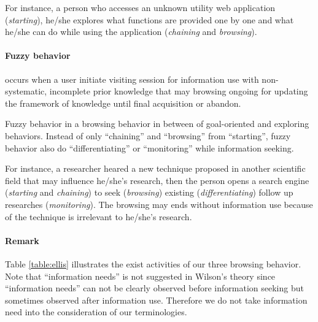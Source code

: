 For instance, a person who accesses an unknown utility web application (\emph{starting}), he/she explores
what functions are provided one by one and what he/she can do while using the application
(\emph{chaining} and \emph{browsing}).

\paragraph{Fuzzy behavior} occurs when a user initiate visiting session for information use
 with non-systematic, incomplete prior knowledge that may browsing ongoing for updating 
the framework of knowledge until final acquisition or abandon.

Fuzzy behavior in a browsing behavior in between of goal-oriented and exploring behaviors.
Instead of only ``chaining'' and ``browsing'' from ``starting'', fuzzy behavior also do
``differentiating'' or ``monitoring'' while information seeking.

For instance, a researcher heared a new technique proposed in another scientific field 
that may influence he/she's research, then the person 
opens a search engine (\emph{starting} and \emph{chaining}) to seek (\emph{browsing}) existing (\emph{differentiating}) 
follow up researches (\emph{monitoring}). The browsing may ends without information use
because of the technique is irrelevant to he/she's research.

\paragraph{Remark} Table \ref{table:ellis} illustrates the exist activities of our three
browsing behavior. Note that ``information needs'' is not suggested in Wilson's theory \cite{wilson1981user} 
since ``information needs'' can not be clearly observed before information seeking but sometimes
observed after information use. Therefore we do not take information need into the 
consideration of our terminologies.


